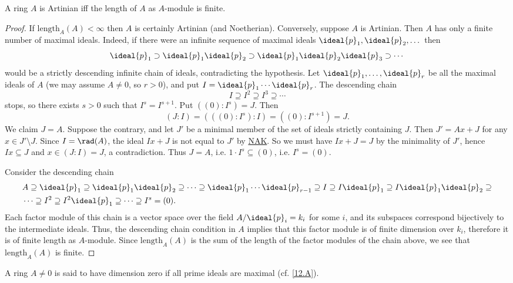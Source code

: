 \documentclass[../main]{subfiles}
\begin{document}
\begin{parproposition*}
A ring $A$ is Artinian iff the length of $A$ as $A$-module is finite.
\end{parproposition*}
\begin{proof}
If $\mathrm{length}_A(A)<\infty$ then $A$ is certainly Artinian (and Noetherian). Conversely, suppose $A$ is Artinian. Then $A$ has only a finite number of maximal ideals. Indeed, if there were an infinite sequence of maximal ideals $\ideal{p}_1,\ideal{p}_2,\dots$ then \[\ideal{p}_1\supset \ideal{p}_1\ideal{p}_2\supset \ideal{p}_1\ideal{p}_2\ideal{p}_3\supset\cdots\]would be a strictly descending infinite chain of ideals, contradicting the hypothesis. Let $\ideal{p}_1,\dots,\ideal{p}_r$ be all the maximal ideals of $A$ (we may assume $A\neq 0$, so $r>0$), and put $I=\ideal{p}_1\cdots \ideal{p}_r$. The descending chain \[I\supseteq I^2\supseteq I^3\supseteq\cdots \]stops, so there exists $s>0$ such that $I^s=I^{s+1}$. Put $((0):I^s)=J$. Then \[(J:I)=(((0):I^s):I)=((0):I^{s+1})=J.\]We claim $J=A$. Suppose the contrary, and let $J'$ be a minimal member of the set of ideals strictly containing $J$. Then $J'=Ax+J$ for any $x\in J'\setminus J$. Since $I=\rad(A)$, the ideal $Ix+J$ is not equal to $J'$ by \hyperref[NAK]{NAK}. So we must have $Ix+J=J$ by the minimality of $J'$, hence $Ix\subseteq J$ and $x\in (J:I)=J$, a contradiction. Thus $J=A$, i.e. $1\cdot I^s\subseteq (0)$, i.e. $I^s=(0)$.

Consider the descending chain
\begin{align*}&A\supseteq\ideal{p}_1\supseteq\ideal{p}_1\ideal{p}_2\supseteq\cdots\supseteq\ideal{p}_1\cdots\ideal{p}_{r-1}\supseteq I\supseteq I\ideal{p}_1\supseteq I\ideal{p}_1\ideal{p}_2\supseteq\\&\cdots\supseteq I^2\supseteq I^2\ideal{p}_1\supseteq\cdots\supseteq I^s=(0).\end{align*}
Each factor module of this chain is a vector space over the field $A/\ideal{p}_i=k_i$ for some $i$, and its subspaces correspond bijectively to the intermediate ideals. Thus, the descending chain condition in $A$ implies that this factor module is of finite dimension over $k_i$, therefore it is of finite length as $A$-module. Since $\mathrm{length}_A(A)$ is the sum of the length of the factor modules of the chain above, we see that $\mathrm{length}_A(A)$ is finite.
\end{proof}

A ring $A\neq 0$ is said to have dimension zero if all prime ideals are maximal (cf. \ref{12.A}).
\end{document}
